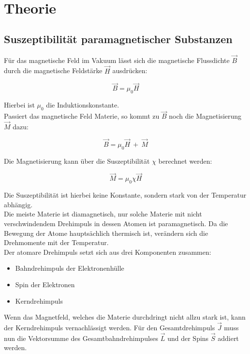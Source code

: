 \section{Theorie}
\label{sec:Theorie}

\subsection{Suszeptibilität paramagnetischer Substanzen}

Für das magnetische Feld im Vakuum lässt sich die magnetische Flussdichte $\vec{B}$ durch die magnetische Feldstärke $\vec{H}$ ausdrücken:

\begin{equation}
    \vec{B} = \mu_0 \vec{H}
\end{equation}

Hierbei ist $\mu_0$ die Induktionskonstante.\\
Passiert das magnetische Feld Materie, so kommt zu $\vec{B}$ noch die Magnetisierung $\vec{M}$ dazu:

\begin{equation}
    \vec{B} = \mu_0 \vec{H}\ +\ \vec{M}
\end{equation}

Die Magnetisierung kann über die Suszeptibilität $\chi$ berechnet werden:

\begin{equation}
    \vec{M} = \mu_0 \chi \vec{H}
\end{equation}

Die Suszeptibilität ist hierbei keine Konstante, sondern stark von der Temperatur abhängig.\\
Die meiste Materie ist diamagnetisch, nur solche Materie mit nicht verschwindendem Drehimpuls in dessen Atomen ist paramagnetisch.
Da die Bewegung der Atome hauptsächlich thermisch ist, verändern sich die Drehmomente mit der Temperatur.\\
Der atomare Drehimpuls setzt sich aus drei Komponenten zusammen:
\begin{itemize}
    \item Bahndrehimpuls der Elektronenhülle
    \item Spin der Elektronen
    \item Kerndrehimpuls
\end{itemize}
Wenn das Magnetfeld, welches die Materie durchdringt nicht allzu stark ist, kann der Kerndrehimpuls vernachlässigt werden.
Für den Gesamtdrehimpuls $\vec{J}$ muss nun die Vektorsumme des Gesamtbahndrehimpulses $\vec{L}$ und der Spins $\vec{S}$ addiert werden.

